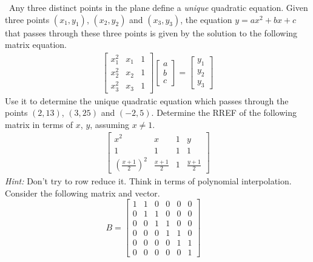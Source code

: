\begin{tasks}[resume, style=enumerate]
{\begin{tasks}[style=enumerate, counter=shapetask, label=(\alph*)]
\begin{displaymath}
      \end{displaymath}
    \end{tasks}
  }
\task
  \faCalculator \ Any three distinct points in the plane define a
  \textit{unique} quadratic equation.  Given three points $(x_1,
  y_1)$, $(x_2, y_2)$ and $(x_3, y_3)$, the equation $y = ax^2 + bx +
  c$ that passes through these three points is given by the solution
  to the following matrix equation.
  \begin{align*}
    \begin{bmatrix}
      x_1^2 & x_1 & 1 \\ x_2^2 & x_2 & 1 \\ x_3^2 & x_3 & 1
    \end{bmatrix}
    \begin{bmatrix} a \\ b \\ c \end{bmatrix}
    =
    \begin{bmatrix} y_1 \\ y_2 \\ y_3 \end{bmatrix}
  \end{align*}
  Use it to determine the unique quadratic equation which passes
  through the points $(2, 13)$, $(3, 25)$ and $(-2, 5)$.
\task
  Determine the RREF of the following matrix in terms of $x$, $y$,
  assuming $x \not = 1$.
  \begin{align*}
    \begin{bmatrix}
      x^2 & x & 1 & y \\ 1 & 1 & 1 & 1 \\ \left(\frac{x +
        1}{2}\right)^2 & \frac{x + 1}{2} & 1 & \frac{y + 1}{2}
    \end{bmatrix}
  \end{align*}
  \textit{Hint:} Don't try to row reduce it. Think in terms of
  polynomial interpolation.
\task
  Consider the following matrix and vector.
  \begin{displaymath}
    B =
    \begin{bmatrix}
      1 & 1 & 0 & 0 & 0 & 0 \\
      0 & 1 & 1 & 0 & 0 & 0 \\
      0 & 0 & 1 & 1 & 0 & 0 \\
      0 & 0 & 0 & 1 & 1 & 0 \\
      0 & 0 & 0 & 0 & 1 & 1 \\
      0 & 0 & 0 & 0 & 0 & 1
    \end{bmatrix}
    \quad

\end{displaymath}
\end{tasks}

